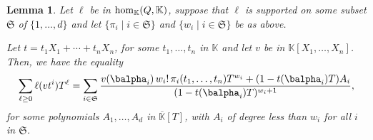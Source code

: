 \documentclass[12pt]{article}
\def\K {\ensuremath{\mathbb{K}}}
\def\Kbar {{\ensuremath{\overline{\mathbb{K}}}}}
\newtheorem{Lemma}{Lemma}
\begin{document}
\begin{Lemma}\label{lemma:formula}
  Let $\ell$ be in ${\rm hom}_\K(Q,\K)$, suppose that $\ell$ is supported on
  some subset 
  $\mathfrak{S}$ of $\{1,\dots,d\}$ and let $\{\pi_i \mid i \in \mathfrak{S}\}$
  and  $\{w_i \mid i \in \mathfrak{S}\}$
  be as above. 

  Let $t=t_1 X_1 + \cdots +t_n X_n$, for some $t_1,\dots,t_n$ in $\K$
  and let $v$ be in $\K[X_1,\dots,X_n]$. Then, we have the equality
  \begin{align}\label{eq:sumgenseries}
  \sum_{\ell \ge 0} \ell(v t^i)T^\ell =
\sum_{i \in \mathfrak{S}} \frac{
  v(\balpha_i)\, w_i!\, \pi_{i}(t_1,\dots,t_n)
  T^{w_i} + (1-t(\balpha_i)    T)A_i}
  {(1-t(\balpha_i) T)^{w_{i}+1}},    
  \end{align}
 for some polynomials $A_1,\dots,A_d$ in
  $\Kbar[T]$, with $A_i$ of degree less than $w_i$ for all $i$
  in $\mathfrak{S}$.
\end{Lemma}
\end{document}
